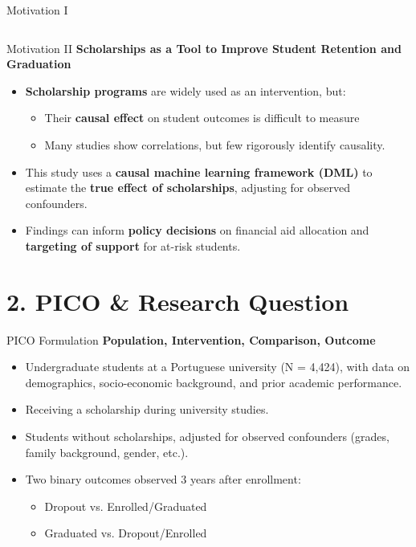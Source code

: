 \documentclass[aspectratio=169]{beamer}
\begin{document}
\begin{frame}{Motivation I}
\begin{columns}
\end{columns}

  	
  \end{frame}
  
  \begin{frame}{Motivation II}
  	\textbf{Scholarships as a Tool to Improve Student Retention and Graduation}
  	
  	\begin{itemize}
  		\item [$\rightarrow$]  \textbf{Scholarship programs} are widely used as an intervention, but:
  		\begin{itemize}
  		  		\item [--] Their  \textbf{causal effect} on student outcomes is difficult to measure
  		  		\item [--] Many studies show correlations, but few rigorously identify causality.
   		\end{itemize}
   		\item [$\rightarrow$] This study uses a \textbf{causal machine learning framework (DML)} to estimate the  \textbf{true effect of scholarships}, adjusting for observed confounders.
   		\item [$\rightarrow$] Findings can inform \textbf{policy decisions} on financial aid allocation and \textbf{targeting of support} for at-risk students.
  	\end{itemize}
  \end{frame}
  
  
  \section{2. PICO \& Research Question}
  
  \begin{frame}{PICO Formulation}
  \textbf{Population, Intervention, Comparison, Outcome}
  	\begin{itemize}
  		\item [P - ] Undergraduate students at a Portuguese university (N = 4,424), with data on demographics, socio-economic background, and prior academic performance.
  		\item [I - ] Receiving a scholarship during university studies.
  		\item [C - ] Students without scholarships, adjusted for observed confounders (grades, family background, gender, etc.).
  		\item [O - ] Two binary outcomes observed 3 years after enrollment:
  
  	\begin{itemize}
  		\item [1.] Dropout vs. Enrolled/Graduated
  		\item [2.] Graduated vs. Dropout/Enrolled
  	\end{itemize}
  	
  	\end{itemize}
  \end{frame}
\end{document}
